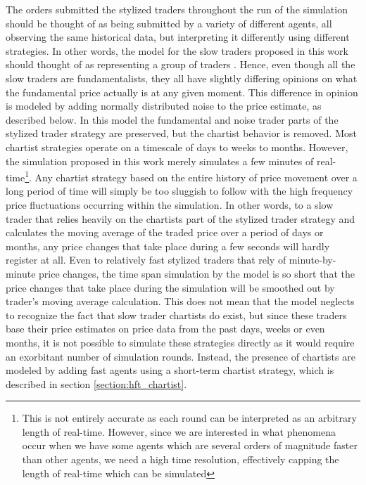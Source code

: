  The orders submitted the stylized traders throughout the run of the simulation should be thought of as being submitted by a variety of different agents, all observing the same historical data, but interpreting it differently using different strategies. In other words, the model for the slow traders proposed in this work should thought of as representing a group of traders \cite{drogoul2003multi}. Hence, even though all the slow traders are fundamentalists, they all have slightly differing opinions on what the fundamental price actually is at any given moment. This difference in opinion is modeled by adding normally distributed noise to the price estimate, as described below. In this model the fundamental and noise trader parts of the stylized trader strategy are preserved, but the chartist behavior is removed. Most chartist strategies operate on a timescale of days to weeks to months. However, the simulation proposed in this work merely simulates a few minutes of real-time\footnote{This is not entirely accurate as each round can be interpreted as an arbitrary length of real-time. However, since we are interested in what phenomena occur when we have some agents which are several orders of magnitude faster than other agents, we need a high time resolution, effectively capping the length of real-time which can be simulated}. Any chartist strategy based on the entire history of price movement over a long period of time will simply be too sluggish to follow with the high frequency price fluctuations occurring within the simulation. In other words, to a slow trader that relies heavily on the chartists part of the stylized trader strategy and calculates the moving average of the traded price over a period of days or months, any price changes that take place during a few seconds will hardly register at all. Even to relatively fast stylized traders that rely of minute-by-minute price changes, the time span simulation by the model is so short that the price changes that take place during the simulation will be smoothed out by trader's moving average calculation. This does not mean that the model neglects to recognize the fact that slow trader chartists do exist, but since these traders base their price estimates on price data from the past days, weeks or even months, it is not possible to simulate these strategies directly as it would require an exorbitant number of simulation rounds. Instead, the presence of chartists are modeled by adding fast agents using a short-term chartist strategy, which is described in section \ref{section:hft_chartist}. 
 

